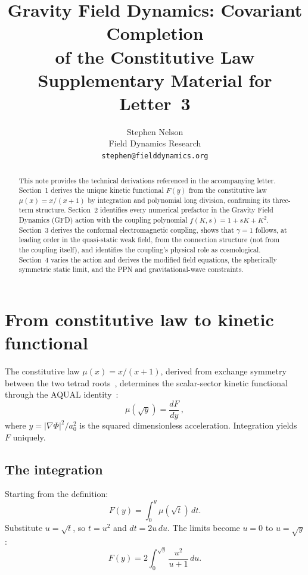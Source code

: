 \documentclass[11pt]{article}
\title{Gravity Field Dynamics: Covariant Completion\\
  of the Constitutive Law\\[6pt]
  {\normalsize Supplementary Material for Letter~3}}
\author{Stephen Nelson\\Field Dynamics Research\\
  \texttt{stephen@fielddynamics.org}}
\date{}
\begin{document}
\maketitle

\begin{abstract}
This note provides the technical derivations referenced
in the accompanying letter.  Section~1
derives the unique kinetic functional $F(y)$ from the
constitutive law $\mu(x) = x/(x{+}1)$ by integration and
polynomial long division, confirming its three-term
structure.  Section~2 identifies every numerical prefactor
in the Gravity Field Dynamics (GFD) action with the
coupling polynomial $f(K,s) = 1 + sK + K^2$.  Section~3
derives the conformal electromagnetic coupling, shows that
$\gamma = 1$ follows, at leading order in the quasi-static
weak field, from the connection structure (not
from the coupling itself), and identifies the coupling's
physical role as cosmological.  Section~4 varies the action and derives the
modified field equations, the spherically symmetric static
limit, and the PPN and gravitational-wave constraints.
\end{abstract}

\section{From constitutive law to kinetic functional}

The constitutive law $\mu(x) = x/(x{+}1)$, derived from
exchange symmetry between the two tetrad
roots~\cite{Nelson2026b}, determines the scalar-sector
kinetic functional through the AQUAL
identity~\cite{BekensteinMilgrom1984}:
\begin{equation}
  \mu(\sqrt{y}) = \frac{dF}{dy}\,,
  \label{eq:aqual_identity}
\end{equation}
where $y = |\nabla\Phi|^2/a_0^2$ is the squared
dimensionless acceleration.  Integration yields $F$
uniquely.

\subsection*{The integration}

Starting from the definition:
\begin{equation}
  F(y) = \int_0^y \mu(\sqrt{t})\,dt.
  \label{eq:F_integral}
\end{equation}
Substitute $u = \sqrt{t}$, so $t = u^2$ and $dt = 2u\,du$.
The limits become $u = 0$ to $u = \sqrt{y}$:
\begin{equation}
  F(y) = 2\int_0^{\sqrt{y}} \frac{u^2}{u + 1}\,du.
  \label{eq:F_substituted}
\end{equation}
\end{document}
